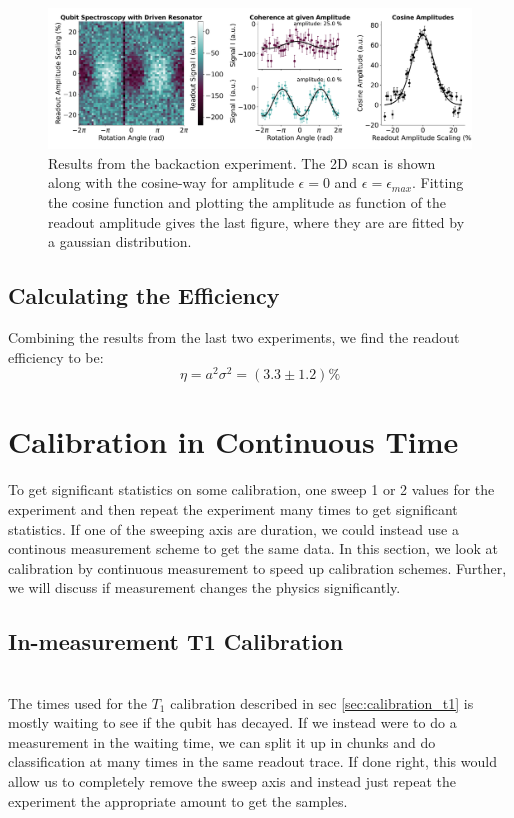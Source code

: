 \begin{figure}
    \centering
    \includegraphics{Calibrations/Figures/dephasing_by_measurement.pdf}
    \caption{Results from the backaction experiment. The 2D scan is shown along with the cosine-way for amplitude $\epsilon = 0$ and $\epsilon = \epsilon_{max}$. Fitting the cosine function and plotting the amplitude as function of the readout amplitude gives the last figure, where they are are fitted by a gaussian distribution.}
    \label{fig:efficiency_dephasing_result}
\end{figure}


\subsection{Calculating the Efficiency}
Combining the results from the last two experiments, we find the readout efficiency to be:
\begin{equation}
    \eta = a^2\sigma^2 = (3.3 \pm 1.2) \% 
\end{equation}


\section{Calibration in Continuous Time}
To get significant statistics on some calibration, one sweep 1 or 2 values for the experiment and then repeat the experiment many times to get significant statistics. If one of the sweeping axis are duration, we could instead use a continous measurement scheme to get the same data. In this section, we look at calibration by continuous measurement to speed up calibration schemes. Further, we will discuss if measurement changes the physics significantly. 

\subsection{In-measurement T1 Calibration}
 \\ \noindent
The times used for the $T_1$ calibration described in sec \ref{sec:calibration_t1} is mostly waiting to see if the qubit has decayed. If we instead were to do a measurement in the waiting time, we can split it up in chunks and do classification at many times in the same readout trace. If done right, this would allow us to completely remove the sweep axis and instead just repeat the experiment the appropriate amount to get the samples.

